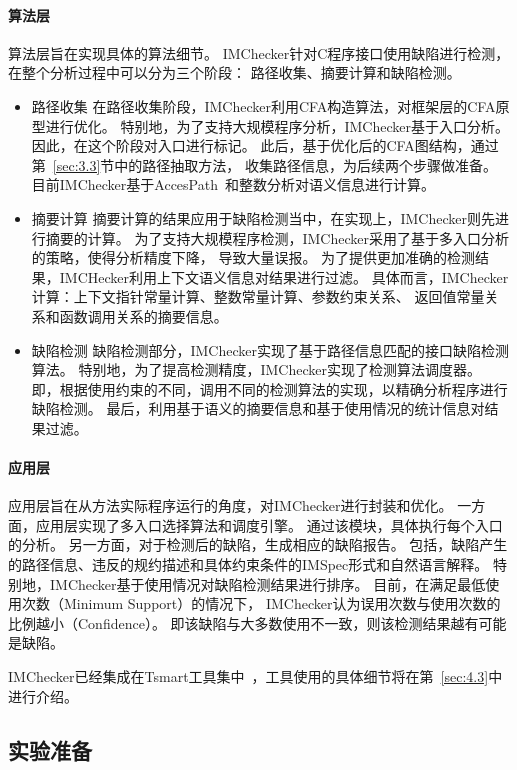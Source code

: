 \paragraph{算法层}
算法层旨在实现具体的算法细节。
IMChecker针对C程序接口使用缺陷进行检测，在整个分析过程中可以分为三个阶段：
路径收集、摘要计算和缺陷检测。
\begin{itemize}
	\item {\kaishu 路径收集} 在路径收集阶段，IMChecker利用CFA构造算法，对框架层的CFA原型进行优化。
	特别地，为了支持大规模程序分析，IMChecker基于入口分析。
	因此，在这个阶段对入口进行标记。
	此后，基于优化后的CFA图结构，通过第~\ref{sec:3.3}节中的路径抽取方法，
	收集路径信息，为后续两个步骤做准备。
	目前IMChecker基于AccesPath~\cite{15-ase-accesspath}和整数分析对语义信息进行计算。
	\item {\kaishu 摘要计算} 
	摘要计算的结果应用于缺陷检测当中，在实现上，IMChecker则先进行摘要的计算。
	为了支持大规模程序检测，IMChecker采用了基于多入口分析的策略，使得分析精度下降，
	导致大量误报。
	为了提供更加准确的检测结果，IMCHecker利用上下文语义信息对结果进行过滤。
	具体而言，IMChecker计算：上下文指针常量计算、整数常量计算、参数约束关系、
	返回值常量关系和函数调用关系的摘要信息。
	\item {\kaishu 缺陷检测} 
	缺陷检测部分，IMChecker实现了基于路径信息匹配的接口缺陷检测算法。
	特别地，为了提高检测精度，IMChecker实现了检测算法调度器。
	即，根据使用约束的不同，调用不同的检测算法的实现，以精确分析程序进行缺陷检测。
	最后，利用基于语义的摘要信息和基于使用情况的统计信息对结果过滤。
\end{itemize}


\paragraph{应用层}
应用层旨在从方法实际程序运行的角度，对IMChecker进行封装和优化。
一方面，应用层实现了多入口选择算法和调度引擎。
通过该模块，具体执行每个入口的分析。
另一方面，对于检测后的缺陷，生成相应的缺陷报告。
包括，缺陷产生的路径信息、违反的规约描述和具体约束条件的IMSpec形式和自然语言解释。
特别地，IMChecker基于使用情况对缺陷检测结果进行排序。
目前，在满足最低使用次数（Minimum Support）的情况下，
IMChecker认为误用次数与使用次数的比例越小（Confidence）。
即该缺陷与大多数使用不一致，则该检测结果越有可能是缺陷。

IMChecker已经集成在Tsmart工具集中~\cite{tsmart}，工具使用的具体细节将在第~\ref{sec:4.3}中进行介绍。

\subsection{实验准备}


